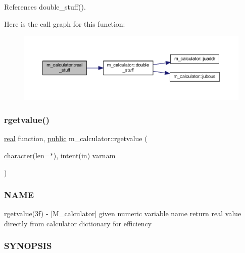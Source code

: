 References double\+\_\+stuff().

Here is the call graph for this function\+:
\nopagebreak
\begin{figure}[H]
\begin{center}
\leavevmode
\includegraphics[width=350pt]{namespacem__calculator_a8337bfb59665d3236fed48d316e3701b_cgraph}
\end{center}
\end{figure}
\mbox{\label{namespacem__calculator_af8d4bcc1789a047303ac7061c2a504e8}} 
\subsubsection{\texorpdfstring{rgetvalue()}{rgetvalue()}}
{\footnotesize\ttfamily \hyperlink{read__watch_83_8txt_abdb62bde002f38ef75f810d3a905a823}{real} function, \hyperlink{M__stopwatch_83_8txt_a2f74811300c361e53b430611a7d1769f}{public} m\+\_\+calculator\+::rgetvalue (\begin{DoxyParamCaption}\item[{\hyperlink{option__stopwatch_83_8txt_abd4b21fbbd175834027b5224bfe97e66}{character}(len=$\ast$), intent(\hyperlink{M__journal_83_8txt_afce72651d1eed785a2132bee863b2f38}{in})}]{varnam }\end{DoxyParamCaption})}



\subsubsection*{N\+A\+ME}

rgetvalue(3f) -\/ \mbox{[}M\+\_\+calculator\mbox{]} given numeric variable name return real value directly from calculator dictionary for efficiency \subsubsection*{S\+Y\+N\+O\+P\+S\+IS}

